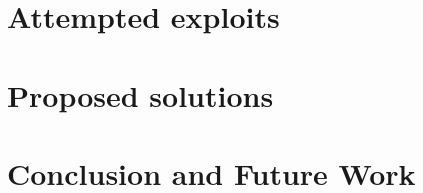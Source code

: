 \documentclass{tudelft-report}
\begin{document}
\chapter{Attempted exploits}\label{cha:3}






\chapter{Proposed solutions}\label{cha:4}







\chapter{Conclusion and Future Work}\label{cha:5}




\appendix

%

\printbibliography
\end{document}
